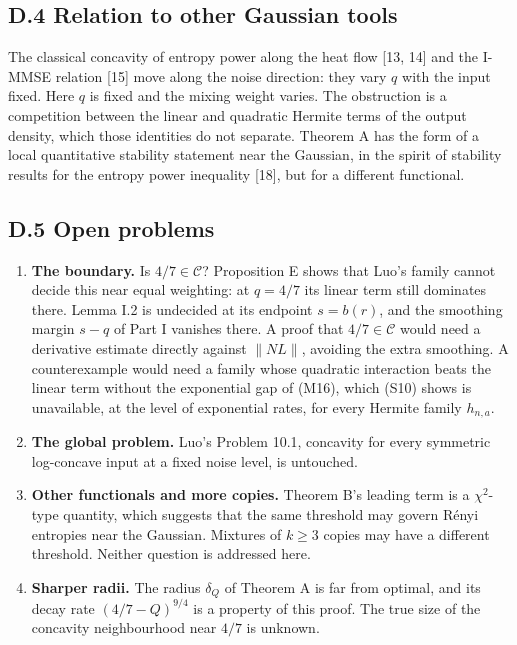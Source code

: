 \documentclass[
  british,
  10pt,
]{article}
\providecommand{\tightlist}{%
  \setlength{\itemsep}{0pt}\setlength{\parskip}{0pt}}
\begin{document}
\subsection{D.4 Relation to other Gaussian
tools}\label{d.4-relation-to-other-gaussian-tools}

The classical concavity of entropy power along the heat flow {[}13,
14{]} and the I-MMSE relation {[}15{]} move along the noise direction:
they vary \(q\) with the input fixed. Here \(q\) is fixed and the mixing
weight varies. The obstruction is a competition between the linear and
quadratic Hermite terms of the output density, which those identities do
not separate. Theorem A has the form of a local quantitative stability
statement near the Gaussian, in the spirit of stability results for the
entropy power inequality {[}18{]}, but for a different functional.

\subsection{D.5 Open problems}\label{d.5-open-problems}

\begin{enumerate}
\def\labelenumi{\arabic{enumi}.}
\tightlist
\item
  \textbf{The boundary.} Is \(4/7\in\mathcal C\)? Proposition E shows
  that Luo's family cannot decide this near equal weighting: at
  \(q=4/7\) its linear term still dominates there. Lemma I.2 is
  undecided at its endpoint \(s=b(r)\), and the smoothing margin \(s-q\)
  of Part I vanishes there. A proof that \(4/7\in\mathcal C\) would need
  a derivative estimate directly against \(\|NL\|\), avoiding the extra
  smoothing. A counterexample would need a family whose quadratic
  interaction beats the linear term without the exponential gap of
  (M16), which (S10) shows is unavailable, at the level of exponential
  rates, for every Hermite family \(h_{n,a}\).
\item
  \textbf{The global problem.} Luo's Problem 10.1, concavity for every
  symmetric log-concave input at a fixed noise level, is untouched.
\item
  \textbf{Other functionals and more copies.} Theorem B's leading term
  is a \(\chi^2\)-type quantity, which suggests that the same threshold
  may govern Rényi entropies near the Gaussian. Mixtures of \(k\ge3\)
  copies may have a different threshold. Neither question is addressed
  here.
\item
  \textbf{Sharper radii.} The radius \(\delta_Q\) of Theorem A is far
  from optimal, and its decay rate \((4/7-Q)^{9/4}\) is a property of
  this proof. The true size of the concavity neighbourhood near \(4/7\)
  is unknown.
\end{enumerate}
\end{document}
